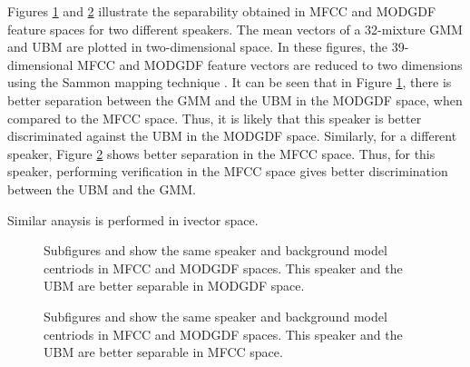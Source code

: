 \documentclass{article}
\begin{document}
Figures \ref{fig:gmm_mgd_opt} and \ref{fig:gmm_mfc_opt} illustrate the
separability obtained in MFCC and MODGDF feature spaces for two different
speakers. The mean vectors of a 32-mixture GMM and UBM are plotted in
two-dimensional space. In these figures, the 39-dimensional MFCC and MODGDF
feature vectors are reduced to two dimensions using the Sammon mapping technique
\cite{sammon}. It can be seen that in Figure \ref{fig:gmm_mgd_opt}, there is
better separation between the GMM and the UBM in the MODGDF space, when compared
to the MFCC space. Thus, it is likely that this speaker is better discriminated
against the UBM in the MODGDF space. Similarly, for a different speaker, 
Figure \ref{fig:gmm_mfc_opt} shows better separation in the MFCC space. Thus,
for this speaker, performing verification in the MFCC space gives better
discrimination between the UBM and the GMM. 

Similar anaysis is performed in ivector space.


\begin{figure}[!h]
\centering
{}
\caption[]{Subfigures  and  
show the same speaker and background model centriods in MFCC and 
MODGDF spaces. This speaker and the UBM are better separable in 
MODGDF space.}
\label{fig:gmm_mgd_opt}
\end{figure}

\begin{figure}[h]
\centering
{}
\caption[]{Subfigures  and  show the 
same speaker and background model centriods in MFCC and MODGDF spaces. This 
speaker and the UBM are better separable in MFCC space.}
\label{fig:gmm_mfc_opt}
\end{figure}
\end{document}
